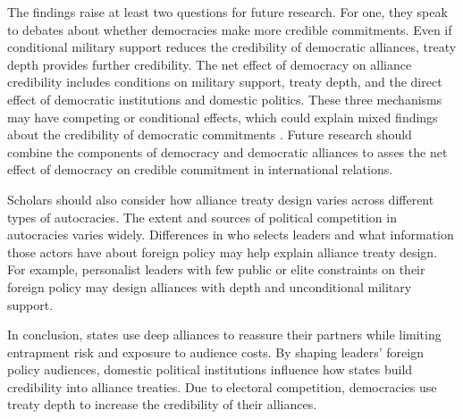 \documentclass[12pt]{article}
\begin{document}
The findings raise at least two questions for future research.  
For one, they speak to debates about whether democracies make more credible commitments. 
Even if conditional military support reduces the credibility of democratic alliances, treaty depth provides further credibility. 
The net effect of democracy on alliance credibility includes conditions on military support, treaty depth, and the direct effect of democratic institutions and domestic politics. 
These three mechanisms may have competing or conditional effects, which could explain mixed findings about the credibility of democratic commitments \citep{Schultz1999, Leeds1999, Thyne2012, DownesSechser2012, PotterBaum2014}.
Future research should combine the components of democracy and democratic alliances to asses the net effect of democracy on credible commitment in international relations. 


Scholars should also consider how alliance treaty design varies across different types of autocracies. 
The extent and sources of political competition in autocracies varies widely. 
Differences in who selects leaders and what information those actors have about foreign policy \citep{Weeks2008} may help explain alliance treaty design.
For example, personalist leaders with few public or elite constraints on their foreign policy may design alliances with depth and unconditional military support. 


In conclusion, states use deep alliances to reassure their partners while limiting entrapment risk and exposure to audience costs. 
By shaping leaders' foreign policy audiences, domestic political institutions influence how states build credibility into alliance treaties.
Due to electoral competition, democracies use treaty depth to increase the credibility of their alliances. 



 
 
\end{document}
